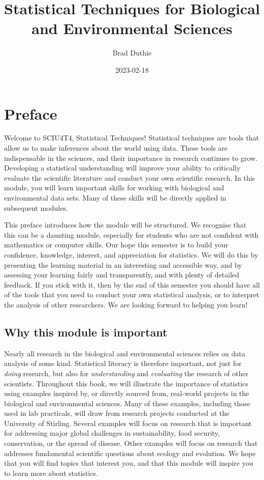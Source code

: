 \documentclass[
]{scrbook}
\title{Statistical Techniques for Biological and Environmental Sciences}
\author{Brad Duthie}
\date{2023-02-18}
\begin{document}
\maketitle

{
\hypersetup{linkcolor=}
\setcounter{tocdepth}{1}
\tableofcontents
}
\hypertarget{preface}{%
\chapter*{Preface}\label{preface}}

Welcome to SCIU4T4, Statistical Techniques!
Statistical techniques are tools that allow us to make inferences about the world using data.
These tools are indispensable in the sciences, and their importance in research continues to grow.
Developing a statistical understanding will improve your ability to critically evaluate the scientific literature and conduct your own scientific research.
In this module, you will learn important skills for working with biological and environmental data sets.
Many of these skills will be directly applied in subsequent modules.

This preface introduces how the module will be structured.
We recognise that this can be a daunting module, especially for students who are not confident with mathematics or computer skills.
Our hope this semester is to build your confidence, knowledge, interest, and appreciation for statistics.
We will do this by presenting the learning material in an interesting and accessible way, and by assessing your learning fairly and transparently, and with plenty of detailed feedback.
If you stick with it, then by the end of this semester you should have all of the tools that you need to conduct your own statistical analysis, or to interpret the analysis of other researchers.
We are looking forward to helping you learn!

\hypertarget{why-this-module-is-important}{%
\section*{Why this module is important}\label{why-this-module-is-important}}

Nearly all research in the biological and environmental sciences relies on data analysis of some kind.
Statistical literacy is therefore important, not just for \emph{doing} research, but also for \emph{understanding} and \emph{evaluating} the research of other scientists.
Throughout this book, we will illustrate the importance of statistics using examples inspired by, or directly sourced from, real-world projects in the biological and environmental sciences.
Many of these examples, including those used in lab practicals, will draw from research projects conducted at the University of Stirling.
Several examples will focus on research that is important for addressing major global challenges in sustainability, food security, conservation, or the spread of disease.
Other examples will focus on research that addresses fundamental scientific questions about ecology and evolution.
We hope that you will find topics that interest you, and that this module will inspire you to learn more about statistics.
\end{document}
